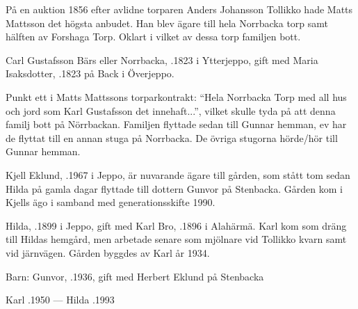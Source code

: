 På en auktion 1856 efter avlidne torparen Anders Johansson Tollikko hade Matts Mattsson det högsta anbudet. Han blev ägare till hela	Norrbacka torp samt hälften av Forshaga Torp. Oklart i vilket av dessa torp  familjen bott.


Carl Gustafsson Bärs eller Norrbacka, .1823 i Ytterjeppo, gift med Maria Isaksdotter, .1823 på Back i Överjeppo.
\begin{jhchildren}
  \item {}
  \item {}
  \item {}
  \item {}
  \item {}
  \item {}
\end{jhchildren}

Punkt ett i Matts Mattssons torparkontrakt: ``Hela Norrbacka Torp med all hus och jord som Karl Gustafsson det innehaft...'', vilket skulle tyda på att denna familj bott på Nörrbackan. Familjen flyttade sedan till Gunnar hemman, ev har de flyttat till en annan stuga på Norrbacka. De övriga stugorna hörde/hör till Gunnar hemman.






Kjell Eklund, .1967 i Jeppo, är nuvarande ägare till gården, som stått tom sedan Hilda på gamla dagar flyttade till dottern Gunvor på Stenbacka. Gården kom i Kjells ägo i samband med generationsskifte 1990.\jhvspace{}


Hilda, .1899 i Jeppo, gift med Karl Bro, .1896 i Alahärmä. Karl kom som dräng till Hildas hemgård, men arbetade senare som mjölnare vid Tollikko kvarn samt vid järnvägen. Gården byggdes av Karl år 1934.

Barn: Gunvor, .1936, gift med Herbert Eklund på Stenbacka

Karl .1950  ---  Hilda .1993



